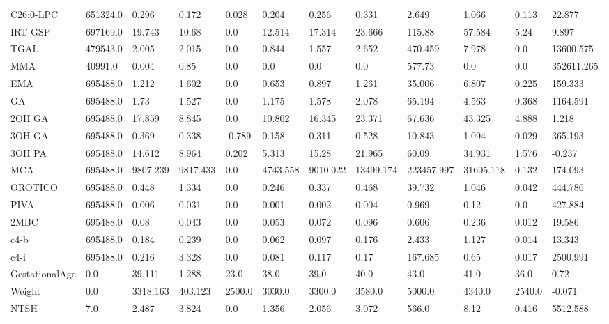 \begin{tabular}{llllllllllll}
C26:0-LPC & 651324.0 & 0.296 & 0.172 & 0.028 & 0.204 & 0.256 & 0.331 & 2.649 & 1.066 & 0.113 & 22.877 \\
IRT-GSP & 697169.0 & 19.743 & 10.68 & 0.0 & 12.514 & 17.314 & 23.666 & 115.88 & 57.584 & 5.24 & 9.897 \\
TGAL & 479543.0 & 2.005 & 2.015 & 0.0 & 0.844 & 1.557 & 2.652 & 470.459 & 7.978 & 0.0 & 13600.575 \\
MMA & 40991.0 & 0.004 & 0.85 & 0.0 & 0.0 & 0.0 & 0.0 & 577.73 & 0.0 & 0.0 & 352611.265 \\
EMA & 695488.0 & 1.212 & 1.602 & 0.0 & 0.653 & 0.897 & 1.261 & 35.006 & 6.807 & 0.225 & 159.333 \\
GA & 695488.0 & 1.73 & 1.527 & 0.0 & 1.175 & 1.578 & 2.078 & 65.194 & 4.563 & 0.368 & 1164.591 \\
2OH GA & 695488.0 & 17.859 & 8.845 & 0.0 & 10.802 & 16.345 & 23.371 & 67.636 & 43.325 & 4.888 & 1.218 \\
3OH GA & 695488.0 & 0.369 & 0.338 & -0.789 & 0.158 & 0.311 & 0.528 & 10.843 & 1.094 & 0.029 & 365.193 \\
3OH PA & 695488.0 & 14.612 & 8.964 & 0.202 & 5.313 & 15.28 & 21.965 & 60.09 & 34.931 & 1.576 & -0.237 \\
MCA & 695488.0 & 9807.239 & 9817.433 & 0.0 & 4743.558 & 9010.022 & 13499.174 & 223457.997 & 31605.118 & 0.132 & 174.093 \\
OROTICO & 695488.0 & 0.448 & 1.334 & 0.0 & 0.246 & 0.337 & 0.468 & 39.732 & 1.046 & 0.042 & 444.786 \\
PIVA & 695488.0 & 0.006 & 0.031 & 0.0 & 0.001 & 0.002 & 0.004 & 0.969 & 0.12 & 0.0 & 427.884 \\
2MBC & 695488.0 & 0.08 & 0.043 & 0.0 & 0.053 & 0.072 & 0.096 & 0.606 & 0.236 & 0.012 & 19.586 \\
c4-b & 695488.0 & 0.184 & 0.239 & 0.0 & 0.062 & 0.097 & 0.176 & 2.433 & 1.127 & 0.014 & 13.343 \\
c4-i & 695488.0 & 0.216 & 3.328 & 0.0 & 0.081 & 0.117 & 0.17 & 167.685 & 0.65 & 0.017 & 2500.991 \\
GestationalAge & 0.0 & 39.111 & 1.288 & 23.0 & 38.0 & 39.0 & 40.0 & 43.0 & 41.0 & 36.0 & 0.72 \\
Weight & 0.0 & 3318.163 & 403.123 & 2500.0 & 3030.0 & 3300.0 & 3580.0 & 5000.0 & 4340.0 & 2540.0 & -0.071 \\
NTSH & 7.0 & 2.487 & 3.824 & 0.0 & 1.356 & 2.056 & 3.072 & 566.0 & 8.12 & 0.416 & 5512.588 \\
\bottomrule
\end{tabular}
